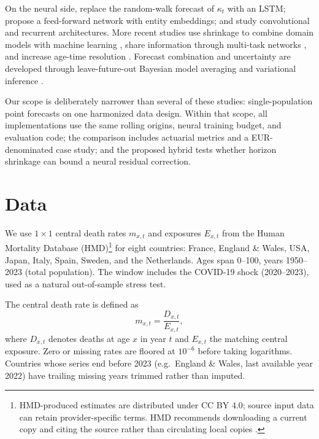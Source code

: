 \documentclass[11pt,a4paper]{article}
\begin{document}
On the neural side, \citet{nigri2019deep} replace the random-walk forecast of $\kappa_t$ with an LSTM; \citet{richman2019neural} propose a feed-forward network with entity embeddings; and \citet{perla2021brief} study convolutional and recurrent architectures. More recent studies use shrinkage to combine domain models with machine learning \citep{li2025boosting}, share information through multi-task networks \citep{demori2025multitask}, and increase age-time resolution \citep{zheng2026finegrained}. Forecast combination and uncertainty are developed through leave-future-out Bayesian model averaging \citep{barigou2023bma} and variational inference \citep{andersson2026variational}.

Our scope is deliberately narrower than several of these studies: single-population point forecasts on one harmonized data design. Within that scope, all implementations use the same rolling origins, neural training budget, and evaluation code; the comparison includes actuarial metrics and a EUR-denominated case study; and the proposed hybrid tests whether horizon shrinkage can bound a neural residual correction.

\section{Data}
\label{sec:data}

We use $1 \times 1$ central death rates $m_{x,t}$ and exposures $E_{x,t}$ from the Human Mortality Database (HMD)\footnote{HMD-produced estimates are distributed under CC BY 4.0; source input data can retain provider-specific terms. HMD recommends downloading a current copy and citing the source rather than circulating local copies \citep{hmd2026agreement}.} for eight countries: France, England \& Wales, USA, Japan, Italy, Spain, Sweden, and the Netherlands. Ages span 0--100, years 1950--2023 (total population). The window includes the COVID-19 shock (2020--2023), used as a natural out-of-sample stress test.

The central death rate is defined as
\begin{equation}
    m_{x,t} = \frac{D_{x,t}}{E_{x,t}},
\end{equation}
where $D_{x,t}$ denotes deaths at age $x$ in year $t$ and $E_{x,t}$ the matching central exposure. Zero or missing rates are floored at $10^{-6}$ before taking logarithms. Countries whose series end before 2023 (e.g.\ England \& Wales, last available year 2022) have trailing missing years trimmed rather than imputed.
\end{document}
